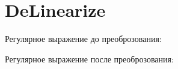 \section{DeLinearize}
\begin{frame}{}
	Регулярное выражение до преоброзования:


	Регулярное выражение после преоброзования:

\end{frame}
